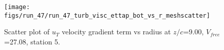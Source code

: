 \begin{figure}[H]
\centering
\texttt{[image: figs/run\_47/run\_47\_turb\_visc\_ettap\_bot\_vs\_r\_meshscatter]}
\caption{Scatter plot of $
u_T$ velocity gradient term vs radius at $z/c$=9.00, $V_{free}$=27.08, station 5.}
\end{figure}


